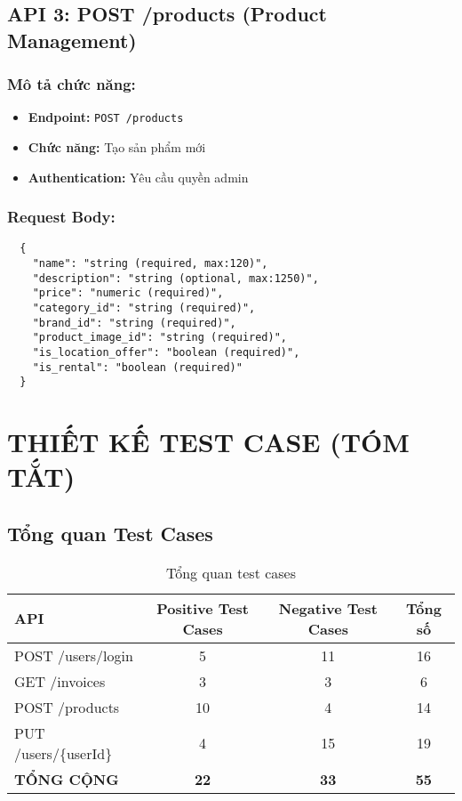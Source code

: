 \documentclass[12pt,a4paper]{article}
\begin{document}
  \subsection{API 3: POST /products (Product Management)}

  \subsubsection{Mô tả chức năng:}
  \begin{itemize}
  \item \textbf{Endpoint:} \texttt{POST /products}
  \item \textbf{Chức năng:} Tạo sản phẩm mới
  \item \textbf{Authentication:} Yêu cầu quyền admin
  \end{itemize}

  \subsubsection{Request Body:}
  \begin{lstlisting}
  {
    "name": "string (required, max:120)",
    "description": "string (optional, max:1250)",
    "price": "numeric (required)",
    "category_id": "string (required)",
    "brand_id": "string (required)",
    "product_image_id": "string (required)",
    "is_location_offer": "boolean (required)",
    "is_rental": "boolean (required)"
  }
  \end{lstlisting}

  \section{THIẾT KẾ TEST CASE (TÓM TẮT)}

  \subsection{Tổng quan Test Cases}

  \begin{table}[H]
  \centering
  \begin{tabular}{|l|c|c|c|}
  \hline
  \textbf{API} & \textbf{Positive Test Cases} & \textbf{Negative Test Cases} & \textbf{Tổng số} \\
  \hline
  POST /users/login & 5 & 11 & 16 \\
  \hline
  GET /invoices & 3 & 3 & 6 \\
  \hline
  POST /products & 10 & 4 & 14 \\
  \hline
  PUT /users/\{userId\} & 4 & 15 & 19 \\
  \hline
  \textbf{TỔNG CỘNG} & \textbf{22} & \textbf{33} & \textbf{55} \\
  \hline
  \end{tabular}
  \caption{Tổng quan test cases}
  \end{table}
\end{document}
